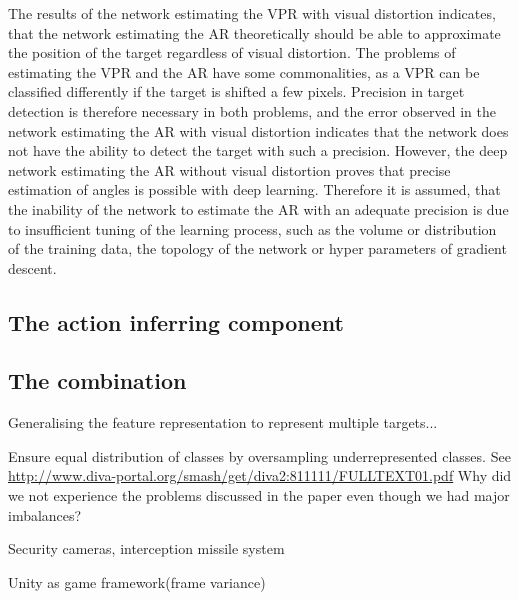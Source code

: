 The results of the network estimating the VPR with visual distortion indicates, that the network estimating the AR theoretically should be able to approximate the position of the target regardless of visual distortion. The problems of estimating the VPR and the AR have some commonalities, as a VPR can be classified differently if the target is shifted a few pixels. Precision in target detection is therefore necessary in both problems, and the error observed in the network estimating the AR with visual distortion indicates that the network does not have the ability to detect the target with such a precision. However, the deep network estimating the AR without visual distortion proves that precise estimation of angles is possible with deep learning. Therefore it is assumed, that the inability of the network  to estimate the AR with an adequate precision is due to insufficient tuning of the learning process, such as the volume or distribution of the training data, the topology of the network or hyper parameters of gradient descent. 

\subsection{The action inferring component}



\subsection{The combination}




Generalising the feature representation to represent multiple targets...

Ensure equal distribution of classes by oversampling underrepresented classes. See \url{http://www.diva-portal.org/smash/get/diva2:811111/FULLTEXT01.pdf} Why did we not experience the problems discussed in the paper even though we had major imbalances?

Security cameras, interception missile system

Unity as game framework(frame variance)